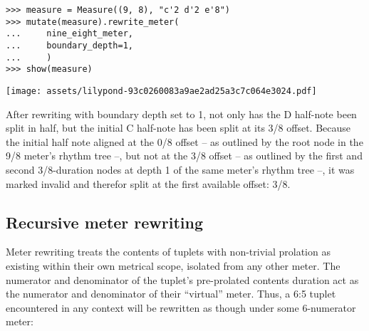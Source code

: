 \begin{comment}
<abjad>
measure = Measure((9, 8), "c'2 d'2 e'8")
mutate(measure).rewrite_meter(
    nine_eight_meter,
    boundary_depth=1,
    )
show(measure)
</abjad>
\end{comment}

\begin{abjadbookoutput}
\begin{singlespacing}
\vspace{-0.5\baselineskip}
\begin{lstlisting}
>>> measure = Measure((9, 8), "c'2 d'2 e'8")
>>> mutate(measure).rewrite_meter(
...     nine_eight_meter,
...     boundary_depth=1,
...     )
>>> show(measure)
\end{lstlisting}
\noindent\texttt{[image: assets/lilypond-93c0260083a9ae2ad25a3c7c064e3024.pdf]}
\end{singlespacing}
\end{abjadbookoutput}

\noindent After rewriting with boundary depth set to 1, not only has the D
half-note been split in half, but the initial C half-note has been split at its
3/8 offset. Because the initial half note aligned at the 0/8 offset -- as
outlined by the root node in the 9/8 meter's rhythm tree --, but not at the 3/8
offset -- as outlined by the first and second 3/8-duration nodes at depth 1 of
the same meter's rhythm tree --, it was marked invalid and therefor split at
the first available offset: 3/8.

\subsection{Recursive meter rewriting} %

Meter rewriting treats the contents of tuplets with non-trivial prolation as
existing within their own metrical scope, isolated from any other meter. The
numerator and denominator of the tuplet's pre-prolated contents duration act as
the numerator and denominator of their \enquote{virtual} meter. Thus, a 6:5
tuplet encountered in any context will be rewritten as though under some
6-numerator meter:

\begin{comment}
<abjad>
parseable = "abj: | 4/4 c'16 ~ c'4 d'8. ~ "
parseable += "2/3 { d'8. ~ 3/5 { d'16 e'8 ~ e'16 f'16 ~ } } "
parseable += "f'4 |"
measure = parse(parseable)
show(measure)
mutate(measure).rewrite_meter(
    measure,
    boundary_depth=1,
    )
show(measure)
</abjad>
\end{comment}

